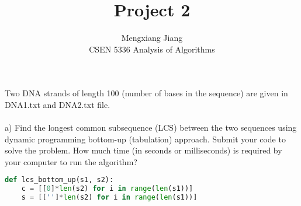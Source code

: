 \documentclass[12pt]{article}
\newenvironment{problem}[2][Problem]{\begin{trivlist}
\item[\hskip \labelsep {\bfseries #1}\hskip \labelsep {\bfseries #2.}]}{\end{trivlist}}
\begin{document}
 
 
\title{Project 2}%
\author{Mengxiang Jiang\\ %
CSEN 5336 Analysis of Algorithms} %
 
\maketitle
 
\begin{problem}{1} %
Two DNA strands of length 100 (number of bases in the sequence) are given in DNA1.txt and
DNA2.txt file.\\\\
a) Find the longest common subsequence (LCS) between the two sequences using dynamic
programming bottom-up (tabulation) approach. Submit your code to solve the problem.
How much time (in seconds or milliseconds) is required by your computer to run the
algorithm?
\begin{lstlisting}[language=Python, caption=Find LCS Bottom Up]
def lcs_bottom_up(s1, s2):
    c = [[0]*len(s2) for i in range(len(s1))]
    s = [['']*len(s2) for i in range(len(s1))]


\end{lstlisting}
\end{problem}
\end{document}
